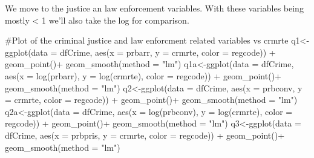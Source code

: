 \documentclass[]{article}
\newenvironment{Shaded}{}{}
\newcommand{\CommentTok}[1]{\textcolor[rgb]{0.00,0.50,0.00}{#1}}
\newcommand{\DataTypeTok}[1]{#1}
\newcommand{\KeywordTok}[1]{\textcolor[rgb]{0.00,0.00,1.00}{#1}}
\newcommand{\NormalTok}[1]{#1}
\newcommand{\OperatorTok}[1]{#1}
\newcommand{\StringTok}[1]{\textcolor[rgb]{0.00,0.50,0.50}{#1}}
\begin{document}
We move to the justice an law enforcement variables. With these
variables being mostly \textless{} 1 we'll also take the log for
comparison.

\begin{Shaded}
\begin{Highlighting}[]
\CommentTok{#Plot of the criminal justice and law enforcment related variables vs crmrte}
\NormalTok{q1<-}\KeywordTok{ggplot}\NormalTok{(}\DataTypeTok{data =}\NormalTok{ dfCrime, }\KeywordTok{aes}\NormalTok{(}\DataTypeTok{x =}\NormalTok{ prbarr, }\DataTypeTok{y =}\NormalTok{ crmrte, }\DataTypeTok{color =}\NormalTok{ regcode)) }\OperatorTok{+}\StringTok{ }
\StringTok{      }\KeywordTok{geom_point}\NormalTok{()}\OperatorTok{+}
\StringTok{  }\KeywordTok{geom_smooth}\NormalTok{(}\DataTypeTok{method =} \StringTok{"lm"}\NormalTok{)}
\NormalTok{q1a<-}\KeywordTok{ggplot}\NormalTok{(}\DataTypeTok{data =}\NormalTok{ dfCrime, }\KeywordTok{aes}\NormalTok{(}\DataTypeTok{x =} \KeywordTok{log}\NormalTok{(prbarr), }\DataTypeTok{y =} \KeywordTok{log}\NormalTok{(crmrte), }\DataTypeTok{color =}\NormalTok{ regcode)) }\OperatorTok{+}\StringTok{ }
\StringTok{      }\KeywordTok{geom_point}\NormalTok{()}\OperatorTok{+}
\StringTok{  }\KeywordTok{geom_smooth}\NormalTok{(}\DataTypeTok{method =} \StringTok{"lm"}\NormalTok{)}
\NormalTok{q2<-}\KeywordTok{ggplot}\NormalTok{(}\DataTypeTok{data =}\NormalTok{ dfCrime, }\KeywordTok{aes}\NormalTok{(}\DataTypeTok{x =}\NormalTok{ prbconv, }\DataTypeTok{y =}\NormalTok{ crmrte, }\DataTypeTok{color =}\NormalTok{ regcode)) }\OperatorTok{+}\StringTok{ }
\StringTok{      }\KeywordTok{geom_point}\NormalTok{()}\OperatorTok{+}
\StringTok{  }\KeywordTok{geom_smooth}\NormalTok{(}\DataTypeTok{method =} \StringTok{"lm"}\NormalTok{)}
\NormalTok{q2a<-}\KeywordTok{ggplot}\NormalTok{(}\DataTypeTok{data =}\NormalTok{ dfCrime, }\KeywordTok{aes}\NormalTok{(}\DataTypeTok{x =} \KeywordTok{log}\NormalTok{(prbconv), }\DataTypeTok{y =} \KeywordTok{log}\NormalTok{(crmrte), }\DataTypeTok{color =}\NormalTok{ regcode)) }\OperatorTok{+}\StringTok{ }
\StringTok{      }\KeywordTok{geom_point}\NormalTok{()}\OperatorTok{+}
\StringTok{  }\KeywordTok{geom_smooth}\NormalTok{(}\DataTypeTok{method =} \StringTok{"lm"}\NormalTok{)}
\NormalTok{q3<-}\KeywordTok{ggplot}\NormalTok{(}\DataTypeTok{data =}\NormalTok{ dfCrime, }\KeywordTok{aes}\NormalTok{(}\DataTypeTok{x =}\NormalTok{ prbpris, }\DataTypeTok{y =}\NormalTok{ crmrte, }\DataTypeTok{color =}\NormalTok{ regcode)) }\OperatorTok{+}\StringTok{ }
\StringTok{      }\KeywordTok{geom_point}\NormalTok{()}\OperatorTok{+}
\StringTok{  }\KeywordTok{geom_smooth}\NormalTok{(}\DataTypeTok{method =} \StringTok{"lm"}\NormalTok{)}

\end{Highlighting}
\end{Shaded}
\end{document}
